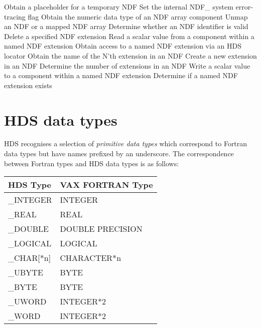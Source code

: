 \documentclass[twoside,11pt,nolof]{starlink}
\begin{document}
{\begin{description}{\addtolength{\itemindent}{-8mm}}
            {Obtain a placeholder for a temporary NDF}
            {Set the internal NDF\_ system error-tracing flag}
            {Obtain the numeric data type of an NDF array component}
            {Unmap an NDF or a mapped NDF array}
            {Determine whether an NDF identifier is valid}
            {Delete a specified NDF extension}
            {Read a scalar value from a component within a named NDF extension}
            {Obtain access to a named NDF extension via an HDS locator}
            {Obtain the name of the N'th extension in an NDF}
            {Create a new extension in an NDF}
            {Determine the number of extensions in an NDF}
            {Write a scalar value to a component within a named NDF extension}
            {Determine if a named NDF extension exists}
\end{description}
}

\newpage
\section{HDS data types\label{apxhds}}

HDS recognises a selection of {\sl primitive data types\/}
which correspond to Fortran data types but have names prefixed by an
underscore.
The correspondence between Fortran types and HDS data types is as follows:

\begin{center}
\begin{tabular}{|l|l|} \hline
\textbf{HDS Type} & \textbf{VAX FORTRAN Type}\\ \hline
\_INTEGER & INTEGER \\
\_REAL & REAL \\
\_DOUBLE & DOUBLE PRECISION\\
\_LOGICAL & LOGICAL \\
\_CHAR[*n] & CHARACTER*n \\
\_UBYTE & BYTE \\
\_BYTE & BYTE \\
\_UWORD & INTEGER*2 \\
\_WORD & INTEGER*2\\
\hline
\end{tabular}
\end{center}
\end{document}
